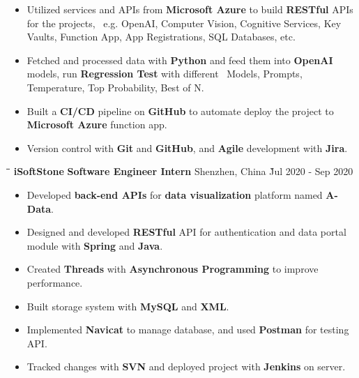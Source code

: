 \documentclass{res}
\begin{document}
\begin{resume}
\begin{itemize}
    \item Utilized services and APIs from {\bf Microsoft Azure} to build {\bf RESTful} APIs for the projects, \
            e.g. OpenAI, Computer Vision, Cognitive Services, Key Vaults, Function App, App Registrations, SQL Databases, etc.
    \item Fetched and processed data with {\bf Python} and feed them into {\bf OpenAI} models, run {\bf Regression Test} with different \
            Models, Prompts, Temperature, Top Probability, Best of N.
    \item Built a {\bf CI/CD} pipeline on {\bf GitHub} to automate deploy the project to {\bf Microsoft Azure} function app.
    \item Version control with {\bf Git} and {\bf GitHub}, and {\bf Agile} development with {\bf Jira}.
    \end{itemize}


    \vspace{-0.05in}	
    \begin{tabbing}
    \hspace{2.3in}\= \hspace{2.2in}\= \hspace{1.6in}\= \kill %
    {\bf iSoftStone} \> {\bf Software Engineer Intern}  \>  
                                    Shenzhen, China   \` Jul 2020 - Sep 2020\\
    \end{tabbing}\vspace{-20pt}      %
    \vspace{+0.1in}
    \begin{itemize} \itemsep 1.5pt %
        \item Developed {\bf back-end APIs} for {\bf data visualization} 
        platform named {\bf A-Data}.
        \item Designed and developed {\bf RESTful} API for authentication and 
                data portal module with {\bf Spring} and {\bf Java}.
        \item Created {\bf Threads} with {\bf Asynchronous Programming} to 
                improve performance.
        \item Built storage system with {\bf MySQL} and {\bf XML}.
        \item Implemented {\bf Navicat} to manage database, and used {\bf Postman} for testing API.
        \item Tracked changes with {\bf SVN} and deployed project with {\bf Jenkins} 
                on server.
    \end{itemize}


\end{resume}
\end{document}
